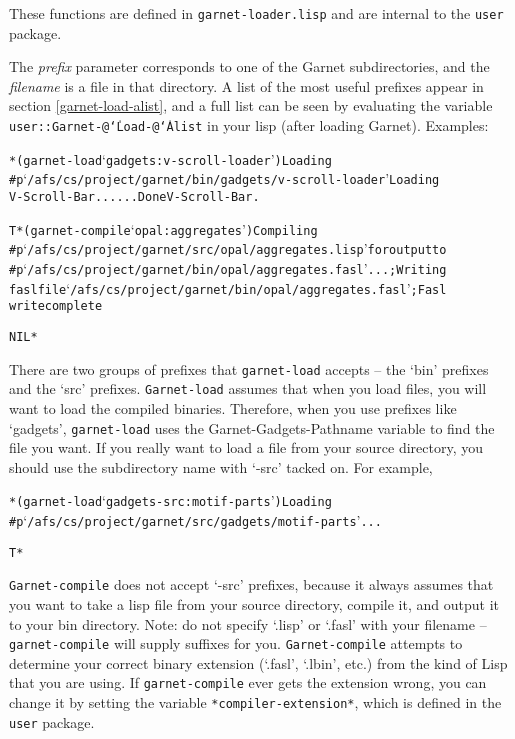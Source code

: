 \documentclass{report}
\newenvironment{programexample}{\begin{alltt}}{\end{alltt}}
\begin{document}
These functions are defined in \texttt{garnet-loader.lisp} and are
internal to the \texttt{user} package.

  The {\it prefix} parameter corresponds to one of the Garnet
  subdirectories, and the {\it filename} is a file in that directory.
  A list of the most useful prefixes appear in section
  \ref{garnet-load-alist}, and a full list can be seen by evaluating
  the variable
  \texttt{user::Garnet-@{\tt\char`\|}Load-@{\tt\char`\|}Alist} in your
  lisp (after loading Garnet).  Examples:

\begin{programexample}
  * (garnet-load `gadgets:v-scroll-loader') Loading
  \#p`/afs/cs/project/garnet/bin/gadgets/v-scroll-loader' Loading
  V-Scroll-Bar...  ...Done V-Scroll-Bar.
  
  T * (garnet-compile `opal:aggregates') Compiling
  \#p`/afs/cs/project/garnet/src/opal/aggregates.lisp' for output to
  \#p`/afs/cs/project/garnet/bin/opal/aggregates.fasl' ...  ; Writing
  fasl file `/afs/cs/project/garnet/bin/opal/aggregates.fasl' ; Fasl
  write complete
  
  NIL *
\end{programexample}

There are two groups of prefixes that \texttt{garnet-load} accepts -- the
`bin' prefixes and the `src' prefixes.  \texttt{Garnet-load} assumes that
when you load files, you will want to load the compiled binaries.
Therefore, when you use prefixes like `gadgets', \texttt{garnet-load} uses
the Garnet-Gadgets-Pathname variable to find the file you want.  If
you really want to load a file from your source directory, you should
use the subdirectory name with `-src' tacked on.  For example,

\begin{programexample}
  * (garnet-load `gadgets-src:motif-parts') Loading
  \#p`/afs/cs/project/garnet/src/gadgets/motif-parts' ...
  
  T *
\end{programexample}

\texttt{Garnet-compile} does not accept `-src' prefixes, because it always
assumes that you want to take a lisp file from your source directory,
compile it, and output it to your bin directory.  Note: do not specify
`.lisp' or `.fasl' with your filename -- \texttt{garnet-compile} will
supply suffixes for you.  \texttt{Garnet-compile} attempts to determine
your correct binary extension (`.fasl', `.lbin', etc.) from the kind
of Lisp that you are using.  If \texttt{garnet-compile} ever gets the
extension wrong, you can change it by setting the variable
\texttt{*compiler-extension*}, which is defined in the \texttt{user} package.
\end{document}
